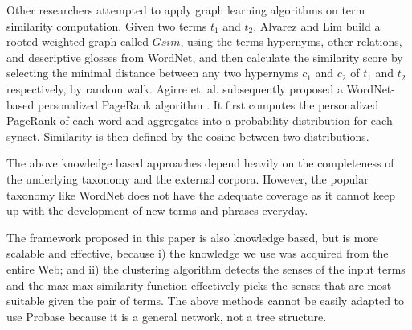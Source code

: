 Other researchers attempted to apply graph learning algorithms
on term similarity computation.
Given two terms $t_1$ and $t_2$, Alvarez and Lim \cite{Alvarez:2007}
build a rooted weighted graph called $Gsim$,
using the terms hypernyms, other relations, and descriptive
glosses from WordNet, and then calculate the similarity score
by selecting the minimal distance between any two hypernyms $c_1$ and
$c_2$ of $t_1$ and $t_2$ respectively, by random walk.
Agirre et. al. subsequently proposed a WordNet-based personalized PageRank
algorithm \cite{Soroa:2009, Agirre:2010}. It first computes
the personalized PageRank of each word and aggregates into
a probability distribution for each synset. Similarity is then defined by
the cosine between two distributions.

The above knowledge based approaches depend heavily
on the completeness of the underlying taxonomy and
the external corpora.
However, the popular taxonomy like WordNet does not have the adequate coverage
as it cannot keep up with the development of new terms and phrases everyday.

The framework proposed in this paper is also knowledge based, but is
more scalable and effective,
because i) the knowledge we use was acquired from the entire Web; and
ii) the clustering algorithm detects the senses of the input terms
and the max-max similarity function effectively picks the senses that are most
suitable given the pair of terms. The above methods cannot be easily adapted
to use Probase because it is a general network, not a tree structure.

